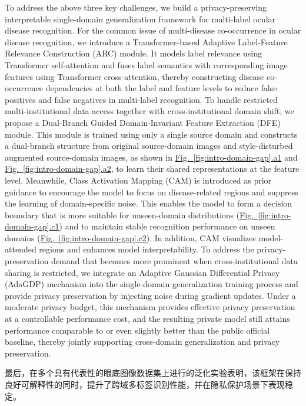 To address the above three key challenges, we build a privacy-preserving interpretable single-domain generalization framework for multi-label ocular disease recognition. For the common issue of multi-disease co-occurrence in ocular disease recognition, we introduce a Transformer-based Adaptive Label-Feature Relevance Construction (ARC) module. It models label relevance using Transformer self-attention and fuses label semantics with corresponding image features using Transformer cross-attention, thereby constructing disease co-occurrence dependencies at both the label and feature levels to reduce false positives and false negatives in multi-label recognition. To handle restricted multi-institutional data access together with cross-institutional domain shift, we propose a Dual-Branch Guided Domain-Invariant Feature Extraction (DFE) module. This module is trained using only a single source domain and constructs a dual-branch structure from original source-domain images and style-disturbed augmented source-domain images, as shown in \hyperref[fig:intro-domain-gap]{Fig.~\ref*{fig:intro-domain-gap}.a1} and \hyperref[fig:intro-domain-gap]{Fig.~\ref*{fig:intro-domain-gap}.a2}, to learn their shared representations at the feature level. Meanwhile, Class Activation Mapping (CAM) is introduced as prior guidance to encourage the model to focus on disease-related regions and suppress the learning of domain-specific noise. This enables the model to form a decision boundary that is more suitable for unseen-domain distributions (\hyperref[fig:intro-domain-gap]{Fig.~\ref*{fig:intro-domain-gap}.c1}) and to maintain stable recognition performance on unseen domains (\hyperref[fig:intro-domain-gap]{Fig.~\ref*{fig:intro-domain-gap}.c2}). In addition, CAM visualizes model-attended regions and enhances model interpretability. To address the privacy-preservation demand that becomes more prominent when cross-institutional data sharing is restricted, we integrate an Adaptive Gaussian Differential Privacy (AdaGDP) mechanism into the single-domain generalization training process and provide privacy preservation by injecting noise during gradient updates. Under a moderate privacy budget, this mechanism provides effective privacy preservation at a controllable performance cost, and the resulting private model still attains performance comparable to or even slightly better than the public official baseline, thereby jointly supporting cross-domain generalization and privacy preservation.

最后，在多个具有代表性的眼底图像数据集上进行的泛化实验表明，该框架在保持良好可解释性的同时，提升了跨域多标签识别性能，并在隐私保护场景下表现稳定。

